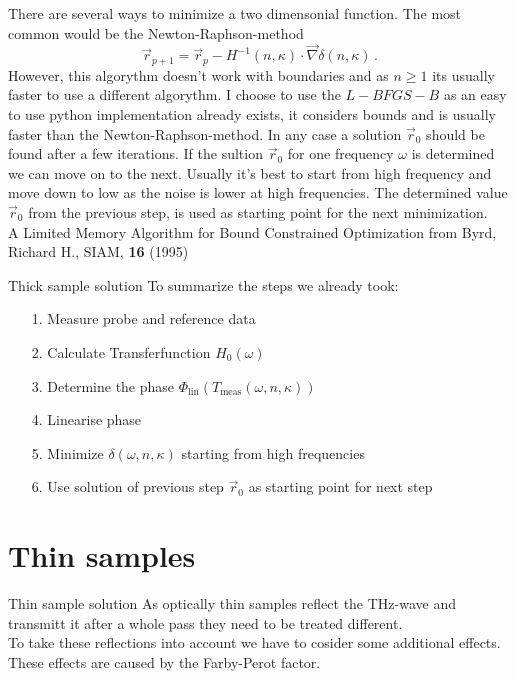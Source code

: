 \documentclass[aspectratio=1610, 9pt]{beamer}
\begin{document}
\begin{frame}
  There are several ways to minimize a two dimensonial function. The most common would be the Newton-Raphson-method
  \begin{equation}
    \vec{r}_{p + 1} = \vec{r}_{p} - H^{-1}(n,\kappa)\cdot\vec{\nabla}\delta(n, \kappa) \, .
  \end{equation}
  However, this algorythm doesn't work with boundaries and as $n \geq 1$ its usually faster to use a different algorythm.
  I choose to use the $L-BFGS-B$ as an easy to use python implementation already exists, it considers bounds and is usually faster than the Newton-Raphson-method.
  In any case a solution $\vec{r}_0$ should be found after a few iterations.
  If the sultion $\vec{r}_0$ for one frequency $\omega$ is determined  we can move on to the next.
  Usually it's best to start from high frequency and move down to low as the noise is lower at high frequencies.
  The determined value $\vec{r}_0$ from the previous step, is used as starting point for the next minimization.\\
  \textcolor{tugreen}{A Limited Memory Algorithm for Bound Constrained Optimization} from Byrd, Richard H., SIAM, \textbf{16} (1995)
\end{frame}

\begin{frame}{Thick sample solution}
  To summarize the steps we already took:
  \begin{itemize}
    \item[1.] Measure probe and reference data 
    \item[2.] Calculate Transferfunction $H_0(\omega)$
    \item[3.] Determine the phase $\Phi_\text{lin}(T_\text{meas}(\omega, n, \kappa))$
    \item[4.] Linearise phase
    \item[5.] Minimize $\delta(\omega, n, \kappa)$ starting from high frequencies
    \item[6.] Use solution of previous step $\vec{r}_0$ as starting point for next step 
  \end{itemize}
\end{frame}

\section{Thin samples}
\begin{frame}{Thin sample solution}
As optically thin samples reflect the THz-wave and transmitt it after a whole pass they need to be treated different.\\
To take these reflections into account we have to cosider some additional effects.\\
These effects are caused by the Farby-Perot factor.
\end{frame}
\end{document}
